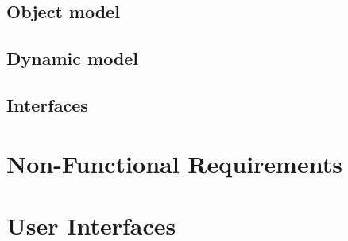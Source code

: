 \documentclass{report}
\begin{document}
\section{Object model}



\section{Dynamic model}



\section{Interfaces}

\chapter{Non-Functional Requirements}

\chapter{User Interfaces}
\end{document}

